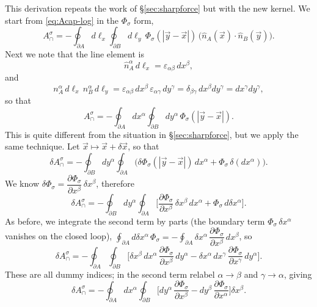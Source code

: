 \documentclass[11pt]{article}
\numberwithin{equation}{section}
\newcommand{\vv}[1]{\vec{#1}}
\newcommand{\eps}{\varepsilon}
\begin{document}
This derivation repeats the work of \S\ref{sec:sharpforce} but with the new kernel. We start from
\eqref{eq:Acap-log} in the $\Phi_\sigma$ form,
\[
  A_\cap^\sigma=-\oint_{\partial A}d\ell_x\oint_{\partial B}d\ell_y\,\Phi_\sigma(|\vv y-\vv x|)\,
  \big(\hat n_A(\vv x)\!\cdot\!\hat n_B(\vv y)\big).
\]
Next we note that the line element is
\begin{equation}\label{eq:nline}
  \hat n_A^\alpha\,d\ell_x=\eps_{\alpha\beta}\,dx^\beta ,
\end{equation}
and
\[
  n_A^\alpha\,d\ell_x\,n_B^\alpha\,d\ell_y=\eps_{\alpha\beta}\,dx^\beta\,\eps_{\alpha\gamma}\,dy^\gamma
  =\delta_{\beta\gamma}\,dx^\beta dy^\gamma=dx^\gamma dy^\gamma ,
\]
so that
\begin{equation}\label{eq:Asig-dxdy}
  A_\cap^\sigma=-\oint_{\partial A}dx^\alpha\oint_{\partial B}dy^\alpha\,\Phi_\sigma(|\vv y-\vv x|).
\end{equation}
This is quite different from the situation in \S\ref{sec:sharpforce}, but we apply the same technique.
Let $\vv x\mapsto\vv x+\delta\vv x$, so that
\[
  \delta A_\cap^\sigma=-\oint_{\partial B}dy^\alpha\oint_{\partial A}
  \big(\delta\Phi_\sigma(|\vv y-\vv x|)\,dx^\alpha+\Phi_\sigma\,\delta(dx^\alpha)\big).
\]
We know $\delta\Phi_\sigma=\dfrac{\partial\Phi_\sigma}{\partial x^\beta}\,\delta x^\beta$, therefore
\begin{equation}\label{eq:dAsig-raw}
  \delta A_\cap^\sigma=-\oint_{\partial B}dy^\alpha\oint_{\partial A}
  \Big[\frac{\partial\Phi_\sigma}{\partial x^\beta}\,\delta x^\beta\,dx^\alpha
  +\Phi_\sigma\,d\delta x^\alpha\Big].
\end{equation}
As before, we integrate the second term by parts (the boundary term $\Phi_\sigma\,\delta x^\alpha$
vanishes on the closed loop), $\oint_{\partial A}d\delta x^\alpha\,\Phi_\sigma
=-\oint_{\partial A}\delta x^\alpha\,\dfrac{\partial\Phi_\sigma}{\partial x^\beta}\,dx^\beta$, so
\[
  \delta A_\cap^\sigma=-\oint_{\partial A}\oint_{\partial B}
  \Big[\delta x^\beta\,dx^\alpha\,\frac{\partial\Phi_\sigma}{\partial x^\beta}\,dy^\alpha
  -\delta x^\alpha\,dx^\gamma\,\frac{\partial\Phi_\sigma}{\partial x^\gamma}\,dy^\alpha\Big].
\]
These are all dummy indices; in the second term relabel $\alpha\to\beta$ and $\gamma\to\alpha$, giving
\begin{equation}\label{eq:dAsig-8p4}
  \delta A_\cap^\sigma=-\oint_{\partial A}dx^\alpha\oint_{\partial B}
  \Big[dy^\alpha\,\frac{\partial\Phi_\sigma}{\partial x^\beta}
  -dy^\beta\,\frac{\partial\Phi_\sigma}{\partial x^\alpha}\Big]\delta x^\beta .
\end{equation}
\end{document}
